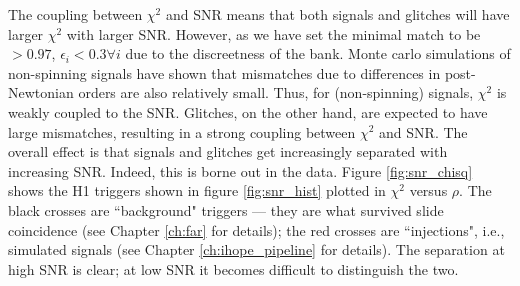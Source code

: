 The coupling between $\chi^2$ and \ac{SNR} means that both signals and glitches will have larger $\chi^2$ with larger \ac{SNR}. However, as we have set the minimal match to be $> 0.97$, $\epsilon_i < 0.3 \forall i$ due to the discreetness of the bank. Monte carlo simulations of non-spinning signals have shown that mismatches due to differences in post-Newtonian orders are also relatively small. Thus, for (non-spinning) signals, $\chi^2$ is weakly coupled to the \ac{SNR}. Glitches, on the other hand, are expected to have large mismatches, resulting in a strong coupling between $\chi^2$ and \ac{SNR}. The overall effect is that signals and glitches get increasingly separated with increasing \ac{SNR}. Indeed, this is borne out in the data. Figure \ref{fig:snr_chisq} shows the H1 triggers shown in figure \ref{fig:snr_hist} plotted in $\chi^2$ versus $\rho$. The black crosses are ``background" triggers --- they are what survived slide coincidence (see Chapter \ref{ch:far} for details); the red crosses are ``injections", i.e., simulated signals (see Chapter \ref{ch:ihope_pipeline} for details). The separation at high \ac{SNR} is clear; at low \ac{SNR} it becomes difficult to distinguish the two.

